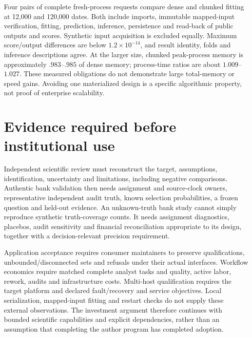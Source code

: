 Four pairs of complete fresh-process requests compare dense and chunked fitting
at 12,000 and 120,000 dates. Both include imports, immutable mapped-input
verification, fitting, prediction, inference, persistence and read-back of
public outputs and scores. Synthetic input acquisition is excluded equally.
Maximum score/output differences are below $1.2\times10^{-14}$, and result
identity, folds and inference descriptions agree. At the larger size, chunked
peak-process memory is approximately $.983$--$.985$ of dense memory; process-time
ratios are about $1.009$--$1.027$. These measured obligations do not demonstrate
large total-memory or speed gains. Avoiding one materialized design is a
specific algorithmic property, not proof of enterprise scalability.

\section{Evidence required before institutional use}
\label{r8:external}

Independent scientific review must reconstruct the target, assumptions,
identification, uncertainty and limitations, including negative comparisons.
Authentic bank validation then needs assignment and source-clock owners,
representative independent audit truth, known selection probabilities, a frozen
question and held-out evidence. An unknown-truth bank study cannot simply
reproduce synthetic truth-coverage counts. It needs assignment diagnostics,
placebos, audit sensitivity and financial reconciliation appropriate to its
design, together with a decision-relevant precision requirement.

Application acceptance requires consumer maintainers to preserve qualifications,
unbounded/disconnected sets and refusals under their actual interfaces. Workflow
economics require matched complete analyst tasks and quality, active labor,
rework, audits and infrastructure costs. Multi-host qualification requires the
target platform and declared fault/recovery and service objectives. Local
serialization, mapped-input fitting and restart checks do not supply these
external observations. The investment argument therefore continues with
bounded scientific capabilities and explicit dependencies, rather than an
assumption that completing the author program has completed adoption.
